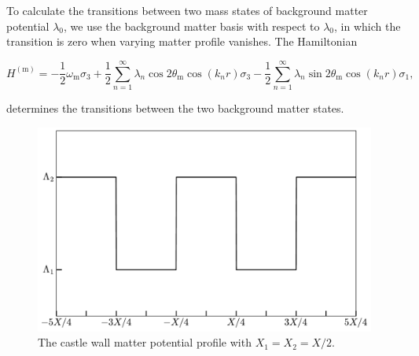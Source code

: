 \documentclass[%
reprint,
 amsmath,amssymb,
 aps,
]{revtex4-1}
\begin{document}
To calculate the transitions between two mass states of background matter potential $\lambda_0$, we use the background matter basis with respect to $\lambda_0$, in which the transition is zero when varying matter profile vanishes. The Hamiltonian
\begin{widetext}
\begin{equation}
H^{(\mathrm m)} = - \frac{1}{2}\omega_{\mathrm m} \sigma_3  + \frac{1}{2} \sum_{n=1}^{\infty} \lambda_n \cos 2\theta_{\mathrm m} \cos\left( k_n  r \right)  \sigma_3 - \frac{1}{2} \sum_{n=1}^{\infty} \lambda_n \sin 2\theta_{\mathrm m}  \cos\left( k_n r \right) \sigma_1,
\label{castle-wall-decomposed-hamiltonian}
\end{equation}
\end{widetext}
determines the transitions between the two background matter states.


\begin{figure}
    \centering
    \includegraphics[width=\columnwidth]{assets/castlewall-profile}
    \caption{The castle wall matter potential profile with $X_1=X_2=X/2$.}
    \label{fig-castlewall-profile-illustration}
\end{figure}
\end{document}
